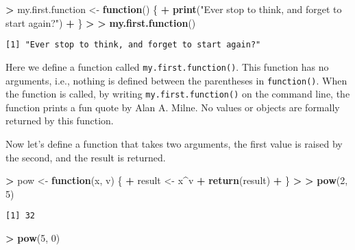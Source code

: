 \documentclass[]{krantz}
\makeatletter
\newenvironment{Shaded}{\begin{snugshade}}{\end{snugshade}}
\newcommand{\KeywordTok}[1]{\textcolor[rgb]{0.27,0.27,0.27}{\textbf{#1}}}
\newcommand{\DecValTok}[1]{\textcolor[rgb]{0.06,0.06,0.06}{#1}}
\newcommand{\StringTok}[1]{\textcolor[rgb]{0.5,0.5,0.5}{#1}}
\newcommand{\ControlFlowTok}[1]{\textcolor[rgb]{0.27,0.27,0.27}{\textbf{#1}}}
\newcommand{\OperatorTok}[1]{\textcolor[rgb]{0.43,0.43,0.43}{\textbf{#1}}}
\newcommand{\ErrorTok}[1]{\textcolor[rgb]{0.14,0.14,0.14}{\textbf{#1}}}
\newcommand{\NormalTok}[1]{#1}
\newenvironment{kframe}{%
\medskip{}
\setlength{\fboxsep}{.8em}
 \def\at@end@of@kframe{}%
 \ifinner\ifhmode%
  \def\at@end@of@kframe{\end{minipage}}%
  \begin{minipage}{\columnwidth}%
 \fi\fi%
 \def\FrameCommand##1{\hskip\@totalleftmargin \hskip-\fboxsep
 \colorbox{shadecolor}{##1}\hskip-\fboxsep
     \hskip-\linewidth \hskip-\@totalleftmargin \hskip\columnwidth}%
 \MakeFramed {\advance\hsize-\width
   \@totalleftmargin\z@ \linewidth\hsize
   \@setminipage}}%
 {\par\unskip\endMakeFramed%
 \at@end@of@kframe}
\renewenvironment{Shaded}{\begin{kframe}}{\end{kframe}}
\theoremstyle{definition}
\theoremstyle{definition}
\theoremstyle{definition}
\theoremstyle{remark}
\makeatother
\begin{document}
\begin{Shaded}
\begin{Highlighting}[]
\OperatorTok{>}\StringTok{ }\NormalTok{my.first.function <-}\StringTok{ }\ControlFlowTok{function}\NormalTok{() \{}
\OperatorTok{+}\StringTok{   }\KeywordTok{print}\NormalTok{(}\StringTok{"Ever stop to think, and forget to start again?"}\NormalTok{)}
\OperatorTok{+}\StringTok{ }\NormalTok{\}}
\OperatorTok{>}\StringTok{ }
\ErrorTok{>}\StringTok{ }\KeywordTok{my.first.function}\NormalTok{()}
\end{Highlighting}
\end{Shaded}

\begin{verbatim}
[1] "Ever stop to think, and forget to start again?"
\end{verbatim}

Here we define a function called \texttt{my.first.function()}. This
function has no arguments, i.e., nothing is defined between the
parentheses in \texttt{function()}. When the function is called, by
writing \texttt{my.first.function()} on the command line, the function
prints a fun quote by Alan A. Milne. No values or objects are formally
returned by this function.

Now let's define a function that takes two arguments, the first value is
raised by the second, and the result is returned.

\begin{Shaded}
\begin{Highlighting}[]
\OperatorTok{>}\StringTok{ }\NormalTok{pow <-}\StringTok{ }\ControlFlowTok{function}\NormalTok{(x, v) \{}
\OperatorTok{+}\StringTok{   }\NormalTok{result <-}\StringTok{ }\NormalTok{x}\OperatorTok{^}\NormalTok{v}
\OperatorTok{+}\StringTok{   }\KeywordTok{return}\NormalTok{(result)}
\OperatorTok{+}\StringTok{ }\NormalTok{\}}
\OperatorTok{>}\StringTok{ }
\ErrorTok{>}\StringTok{ }\KeywordTok{pow}\NormalTok{(}\DecValTok{2}\NormalTok{, }\DecValTok{5}\NormalTok{)}
\end{Highlighting}
\end{Shaded}

\begin{verbatim}
[1] 32
\end{verbatim}

\begin{Shaded}
\begin{Highlighting}[]
\OperatorTok{>}\StringTok{ }\KeywordTok{pow}\NormalTok{(}\DecValTok{5}\NormalTok{, }\DecValTok{0}\NormalTok{)}
\end{Highlighting}
\end{Shaded}
\end{document}
